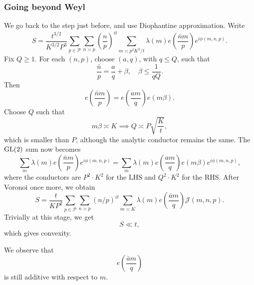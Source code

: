 \documentclass[reqno]{amsart} 
\begin{document}
\subsubsection{Going beyond Weyl}

We go back to the step just before, and use Diophantine approximation.  Write
\begin{equation*}
  S = \frac{t^{3/2}}{K^{3/2} P^3}
  \sum_{p \in \mathcal{P}}
  \sum_{n \asymp p}
  \left( \frac{n}{p} \right)^{i t}
  \sum_{m \asymp p^2 K^2 / t}
  \lambda(m)
  e \left( \frac{\bar{n} m}{ p} \right)
  e^{i \phi(m, n, p)}.
\end{equation*}
Fix $Q \geq 1$.  For each $(n, p)$, choose $(a, q)$, with $q \leq Q$, such that
\begin{equation*}
  \frac{\bar{n}}{p} = \frac{a}{q} + \beta, \quad
  \beta \leq \frac{1}{q Q}.
\end{equation*}
Then
\begin{equation*}
  e \left( \frac{\bar{n}m}{p} \right)
  = e \left( \frac{a m}{q} \right)
  e(m \beta).
\end{equation*}
Choose $Q$ such that
\begin{equation*}
  m \beta \asymp K \implies Q \asymp P \sqrt{\frac{K}{t}},
\end{equation*}
which is smaller than $P$, although the analytic conductor remains the same.  The $\operatorname{GL}(2)$ sum now becomes
\begin{equation*}
  \sum_{m} \lambda(m) e \left( \frac{\bar{n} m}{p} \right)
  e^{i \phi(m, n, p)}
  =
  \sum_{m } \lambda(m)
  e \left( \frac{a m}{q} \right)
  e(m \beta)
  e^{i \phi(m,n , p)},
\end{equation*}
where the conductors are $P^2 \cdot K^2$ for the LHS and $Q^2 \cdot K^2$ for the RHS.  After Voronoi once more, we obtain
\begin{equation*}
  S = \frac{t}{K P^2} \sum_{p \in \mathcal{P}} \sum_{n \asymp p}
  (n /p)^{i t}
  \sum_{m \asymp K}
  \lambda(m)
  e \left( \frac{\bar{a} m}{q} \right) \mathcal{J}(m, n, p).
\end{equation*}
Trivially at this stage, we get
\begin{equation*}
  S \ll t,
\end{equation*}
which gives convexity.

We observe that
\begin{equation*}
  e \left( \frac{\bar{a} m}{q} \right)
\end{equation*}
is still additive with respect to $m$.
\end{document}
